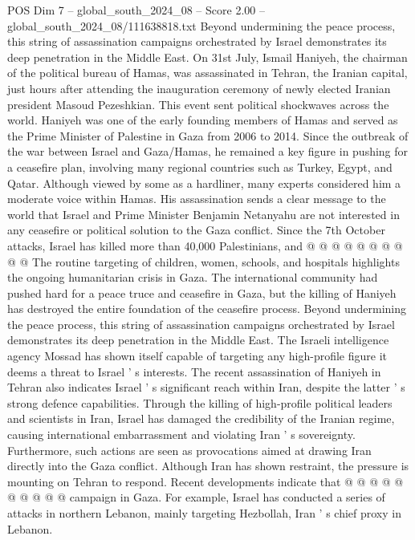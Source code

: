 \begin{textsample}{POS Dim 7 – global\_south\_2024\_08 – Score 2.00 – global\_south\_2024\_08/111638818.txt}  \label{ex:f7_pos_071}
Beyond undermining the peace process, this string of assassination campaigns orchestrated by Israel demonstrates its deep penetration in the Middle East.
On 31st July, Ismail Haniyeh, the chairman of the political bureau of Hamas, was assassinated in Tehran, the Iranian capital, just hours after attending the inauguration ceremony of newly elected Iranian president Masoud Pezeshkian.
This event sent political shockwaves across the world.
Haniyeh was one of the early founding members of Hamas and served as the Prime Minister of Palestine in Gaza from 2006 to 2014.
Since the outbreak of the war between Israel and Gaza/Hamas, he remained a key figure in pushing for a ceasefire plan, involving many regional countries such as Turkey, Egypt, and Qatar.
Although viewed by some as a hardliner, many experts considered him a moderate voice within Hamas.
His assassination sends a clear message to the world that Israel and Prime Minister Benjamin Netanyahu are not interested in any ceasefire or political solution to the Gaza conflict.
Since the 7th October attacks, Israel has killed more than 40,000 Palestinians, and @ @ @ @ @ @ @ @ @ @ The routine targeting of children, women, schools, and hospitals highlights the ongoing humanitarian crisis in Gaza.
The international community had pushed hard for a peace truce and ceasefire in Gaza, but the killing of Haniyeh has destroyed the entire foundation of the ceasefire process.
Beyond undermining the peace process, this string of assassination campaigns orchestrated by Israel demonstrates its deep penetration in the Middle East.
The Israeli intelligence agency Mossad has shown itself capable of targeting any high-profile figure it deems a threat to Israel ' s interests.
The recent assassination of Haniyeh in Tehran also indicates Israel ' s significant reach within Iran, despite the latter ' s strong defence capabilities.
Through the killing of high-profile political leaders and scientists in Iran, Israel has damaged the credibility of the Iranian regime, causing international embarrassment and violating Iran ' s sovereignty.
Furthermore, such actions are seen as provocations aimed at drawing Iran directly into the Gaza conflict.
Although Iran has shown restraint, the pressure is mounting on Tehran to respond.
Recent developments indicate that @ @ @ @ @ @ @ @ @ @ campaign in Gaza.
For example, Israel has conducted a series of attacks in northern Lebanon, mainly targeting Hezbollah, Iran ' s chief proxy in Lebanon.

\end{textsample}
